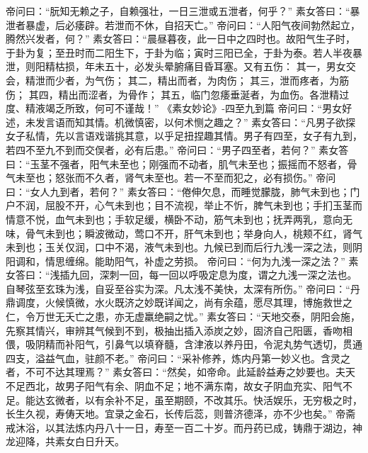 \documentclass[12pt,UTF8]{ctexbook}
\begin{document}
帝问曰：“朊知无赖之子，自赖强壮，一日三泄或五泄者，何乎？”
素女答曰：“暴泄者暴虚，后必痿辟。若泄而不休，自招天亡。”
帝问曰：“人阳气夜间勃然起立，腾然兴发者，何？”
素女答曰：“晨昼暮夜，此一日中之四时也。故阳气生子时，于卦为复；至丑时而二阳生下，于卦为临；寅时三阳已全，于卦为泰。若人半夜暴泄，则阳精枯损，年未五十，必发头晕腑痛目昏耳塞。又有五伤：
其一，男女交会，精泄而少者，为气伤；
其二，精出而者，为肉伤；
其三，泄而疼者，为筋伤；
其四，精出而涩者，为骨作；
其五，临门忽痿垂涎者，为血伤。各泄精过度、精液竭乏所致，何可不谨哉！”
《素女妙论》-四至九到篇
帝问曰：“男女好述，未发言语而知其情。机微慎密，以何术恻之趣之？”
素女答曰：“凡男子欲探女子私情，先以言语戏谐挑其意，以乎足扭捏趣其情。男子有四至，女子有九到，若四不至九不到而交俣者，必有后患。”
帝问曰：“男子四至者，若何？”
素女答曰：“玉茎不强者，阳气未至也；刚强而不动者，肌气未至也；振摇而不怒者，骨气未至也；怒张而不久者，肾气未至也。若一不至而犯之，必有损伤。”
帝问曰：“女人九到者，若何？”
素女答曰：“倦伸欠息，而睡觉朦胧，肺气未到也；门户不润，屈股不开，心气未到也；目不流视，举止不忻，脾气未到也；手扪玉茎而情意不悦，血气未到也；手软足缓，横卧不动，筋气未到也；抚弄两乳，意向无味，骨气未到也；瞬波微动，莺口不开，肝气未到也；举身向人，桃颊不红，肾气未到也；玉关仅润，口中不渴，液气未到也。九候已到而后行九浅一深之法，则阴阳调和，情思缠绵。能助阳气，补虚之劳损。
帝问曰：“何为九浅一深之法？”
素女答曰：“浅插九回，深刺一回，每一回以呼吸定息为度，谓之九浅一深之法也。自琴弦至玄珠为浅，自妥至谷实为深。凡太浅不美快，太深有所伤。”
帝问曰：“丹鼎调度，火候慎微，水火既济之妙既详闻之，尚有余蕴，愿尽其理，博施救世之仁，令万世无夭亡之患，亦无虚羸绝嗣之忧。”
素女答曰：“天地交泰，阴阳会施，先察其情兴，审辨其气候到不到，极抽出插入添炭之妙，固济自己阳匮，香吻相偎，吸阴精而补阳气，引鼻气以填脊髓，含津液以养丹田，令泥丸势气透切，贯通四支，溢益气血，驻颜不老。”
帝问曰：“采补修养，炼内丹第一妙义也。含灵之者，不可不达其理焉？”
素女答曰：“然矣，如帝命。此延龄益寿之妙要也。夫天不足西北，故男子阳气有余、阴血不足；地不满东南，故女子阴血充实、阳气不足。能达玄微者，以有余补不足，虽至期颐，不改其乐。快活娱乐，无穷极之时，长生久视，寿俦天地。宜录之金石，长传后蕊，则普济德泽，亦不少也矣。”
帝斋戒沐浴，以其法炼内丹八十一日，寿至一百二十岁。而丹药已成，铸鼎于湖边，神龙迎降，共素女白日升天。

\backmatter
\end{document}
